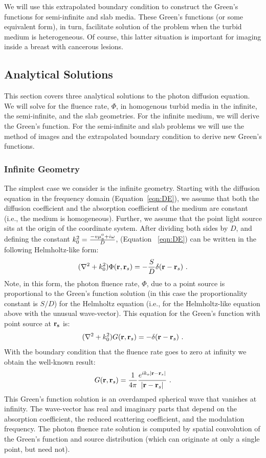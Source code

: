 We will use this extrapolated boundary condition to construct the Green's functions for semi-infinite and slab media. These Green's functions (or some equivalent form), in turn, facilitate solution of the problem when the turbid medium is heterogeneous. Of course, this latter situation is important for imaging inside a breast with cancerous lesions.
%
\subsection{Analytical Solutions}
This section covers three analytical solutions to the photon diffusion equation. We will solve for the fluence rate, $\Phi$, in homogenous turbid media in the infinite, the semi-infinite, and the slab geometries. For the infinite medium, we will derive the Green's function. For the semi-infinite and slab problems we will use the method of images and the extrapolated boundary condition to derive new Green's functions. 

\subsubsection{Infinite Geometry}
The simplest case we consider is the infinite geometry. Starting with the diffusion equation in the frequency domain (Equation~\ref{eqn:DE}), we assume that both the diffusion coefficient and the absorption coefficient of the medium are constant (i.e., the medium is homogeneous). Further, we assume that the point light source sits at the origin of the coordinate system. After dividing both sides by $D$, and defining the constant $k_0^2 = \frac{- v\mu_a^0 + i\omega}{D}$, (Equation ~\ref{eqn:DE}) can be written in the following Helmholtz-like form:
%
\begin{equation}
\label{eqn:DEhelm}
(\nabla^2+k_0^2)\Phi(\mathbf{r},\mathbf{r}_s)=-\frac{S}{D}\delta(\mathbf{r}-\mathbf{r}_s) \ .
\end{equation}
%
\noindent
Note, in this form, the photon fluence rate, $\Phi$, due to a point source is proportional to the Green's function solution (in this case the proportionality constant is $S/D$) for the Helmholtz equation (i.e., for the Helmholtz-like equation above with the unusual wave-vector). This equation for the Green's function with point source at $\mathbf{r_s}$ is:
%
\begin{equation}
\label{eqn:Ghelm}
(\nabla^2+k_0^2)G(\mbf{r},\mbf{r}_s)=-\delta(\mbf{r}-\mbf{r}_s) \ .
\end{equation}
%
\noindent
With the boundary condition that the fluence rate goes to zero at infinity we obtain the well-known result:
%
\begin{equation}
\label{eqn:Ginf}
G(\mbf{r},\mbf{r}_s) = \frac{1}{4\pi}\frac{e^{ik_o|\mbf{r}-\mbf{r}_s|}}{|\mbf{r}-\mbf{r}_s|} \ .
\end{equation}
%
This Green's function solution is an overdamped spherical wave that vanishes at infinity. The wave-vector has real and imaginary parts that depend on the absorption coefficient, the reduced scattering coefficient, and the modulation frequency. The photon fluence rate solution is computed by spatial convolution of the Green's function and source distribution (which can originate at only a single point, but need not).
%
